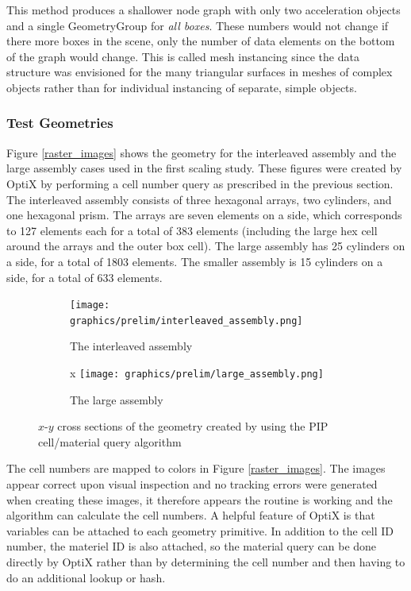 This method produces a shallower node graph with only two acceleration objects and a single GeometryGroup for \emph{all boxes}.  These numbers would not change if there more boxes in the scene, only the number of data elements on the bottom of the graph would change.  This is called mesh instancing since the data structure was envisioned for the many triangular surfaces in meshes of complex objects rather than for individual instancing of separate, simple objects.


\subsubsection{Test Geometries}

Figure \ref{raster_images} shows the geometry for the interleaved assembly and the large assembly cases used in the first scaling study.  These figures were created by OptiX by performing a cell number query as prescribed in the previous section.  The interleaved assembly consists of three hexagonal arrays, two cylinders, and one hexagonal prism.  The arrays are seven elements on a side, which corresponds to 127 elements each for a total of 383 elements (including the large hex cell around the arrays and the outer box cell).  The large assembly has 25 cylinders on a side, for a total of 1803 elements.  The smaller assembly is 15 cylinders on a side, for a total of 633 elements.

\begin{figure}[h!]
\centering
\begin{subfigure}{.5\textwidth}
  \centering
  \texttt{[image: graphics/prelim/interleaved\_assembly.png]}
  \caption{The interleaved assembly}
  \label{fig:sub1}
\end{subfigure}%
\begin{subfigure}{.5\textwidth}x
  \centering
  \texttt{[image: graphics/prelim/large\_assembly.png]}
  \caption{The large assembly}
  \label{fig:sub2}
\end{subfigure}
\caption{$x$-$y$ cross sections of the geometry created by using the PIP cell/material query algorithm \label{raster_images}}
\label{fig:test}
\end{figure}

The cell numbers are mapped to colors in Figure \ref{raster_images}. The images appear correct upon visual inspection and no tracking errors were generated when creating these images, it therefore appears the routine is working and the algorithm can calculate the cell numbers.  A helpful feature of OptiX is that variables can be attached to each geometry primitive.  In addition to the cell ID number, the materiel ID is also attached, so the material query can be done directly by OptiX rather than by determining the cell number and then having to do an additional lookup or hash.


